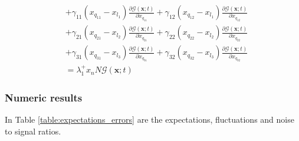 \documentclass[a4paper, 11pt]{article}
\begin{document}
\begin{equation*}
\begin{split}
    &+\gamma_{11}\left(x_{q_{11}}-x_{l_1}\right)\frac{\partial\mathcal G(\mathbf x;t)}{\partial x_{q_{11}}} + \gamma_{12}\left(x_{q_{12}}-x_{l_1}\right)\frac{\partial\mathcal G(\mathbf x;t)}{\partial x_{q_{12}}}\\
    &+\gamma_{21}\left(x_{q_{21}}-x_{l_2}\right)\frac{\partial\mathcal G(\mathbf x;t)}{\partial x_{q_{21}}} + \gamma_{22}\left(x_{q_{22}}-x_{l_2}\right)\frac{\partial\mathcal G(\mathbf x;t)}{\partial x_{q_{22}}}\\
    &+\gamma_{31}\left(x_{q_{31}}-x_{l_3}\right)\frac{\partial\mathcal G(\mathbf x;t)}{\partial x_{q_{31}}} + \gamma_{32}\left(x_{q_{32}}-x_{l_3}\right)\frac{\partial\mathcal G(\mathbf x;t)}{\partial x_{q_{32}}}\\
    &=\lambda_1^+x_nN\mathcal G(\mathbf x; t)
  \end{split}
\end{equation*}

\subsubsection{Numeric results}
In Table \ref{table:expectations_errors} are the expectations, fluctuations and noise to signal ratios.
\end{document}
